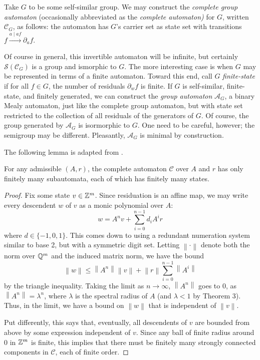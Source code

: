 \documentclass[11pt, titlepage]{article}
\newcommand{\norm}[1]{\left\lVert#1\right\rVert}
\begin{document}
\begin{definition}
  Take $G$ to be some self-similar group. We may construct the
  \emph{complete group automaton} (occasionally abbreviated as the
  \emph{complete automaton)} for $G$, written $\mathcal{C}_G$, as
  follows: the automaton has $G$'s carrier set as state set with
  transitions $f \stackrel{a\mid af}{\longrightarrow} \partial_a f$.
\end{definition}

Of course in general,
this invertible automaton will be infinite, but certainly
$\mathcal{S}(\mathcal{C}_G)$ is a group and ismorphic to $G$. The more
interesting case is when $G$ may be represented in terms of a finite
automaton. Toward this end, call $G$ \emph{finite-state} if for all
$f \in G$, the number of residuals $\partial_w f$ is finite. If $G$ is
self-similar, finite-state, and finitely generated, we can construct
the \emph{group automaton} $\mathcal{A}_G$, a binary Mealy automaton,
just like the complete group automaton, but with state set restricted
to the collection of all residuals of the generators of $G$. Of
course, the group generated by $\mathcal{A}_G$ is isormorphic to
$G$. One need to be careful, however; the semigroup may be
different. Pleasantly, $\mathcal{A}_G$ is minimal by construction.

The following lemma is adapted from \cite{okano:thesis}. 

\begin{lemma}
  For any admissible $(A, r)$, the complete automaton $\mathcal{C}$
  over $A$ and $r$ has only finitely many subautomata, each of which
  has finitely many states.
\end{lemma}
\begin{proof}
  Fix some state $v \in \mathbb{Z}^m$. Since residuation is an affine map, we
  may write every descendent $w$ of $v$ as a monic polynomial over $A$:
  \[
    w = A^nv + \sum_{i = 0}^{n-1}d_i A^i r
  \]
  where $d \in \{-1, 0, 1\}$. This comes down to using a redundant
  numeration system similar to base 2, but with a symmetric digit set.
  Letting $\norm{\cdot}$ denote both the norm over $\mathbb{Q}^m$ and the
  induced matrix norm, we have the bound
  \[
    \norm{w} \leq \norm{A^n}\norm{v} + \norm{r} \sum_{i=0}^{n-1} \norm{A^i}
  \]
  by the triangle inequality. Taking the limit as
  $n\rightarrow\infty$, $\norm{A^n}$ goes to 0, as
  $\norm{A^n} = \lambda^n$, where $\lambda$ is the spectral radius of
  $A$ (and $\lambda < 1$ by Theorem 3). Thus, in the limit, we have a
  bound on $\norm{w}$ that is independent of $\norm{v}$.

  Put differently, this says that, eventually, all descendents of $v$
  are bounded from above by some expression independent of $v$. Since
  any ball of finite radius around 0 in $\mathbb{Z}^m$ is finite, this implies
  that there must be finitely many strongly connected components in
  $\mathcal{C}$, each of finite order.
\end{proof}
\end{document}

